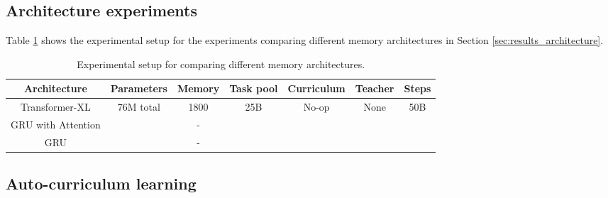 \documentclass[11pt, a4paper, logo, copyright]{deepmind}
\begin{document}
\begin{appendix}
\subsection{Architecture experiments}
\label{app:architecture-experiments}
Table \ref{tab:arch_exp} shows the experimental setup for the experiments comparing different memory architectures in Section \ref{sec:results_architecture}.
\begin{table}[h!]
  \begin{center}
    \caption{Experimental setup for comparing different memory architectures.}
    \begin{tabular}{c|c|c|c|c|c|c}
    \label{tab:arch_exp}
      Architecture & Parameters & Memory & Task pool & Curriculum & Teacher & Steps\\
      \hline
      Transformer-XL & \multirow{3}{*}{76M total} & 1800 & \multirow{3}{*}{25B} &\multirow{3}{*}{No-op}  & \multirow{3}{*}{None} & \multirow{3}{*}{50B} \\
      GRU with Attention & & - & & & & \\
      GRU & & - & & & & \\
    \end{tabular}
  \end{center}
\end{table}
\subsection{Auto-curriculum learning}
\label{app:autocurriculum}

\end{appendix}
\end{document}
